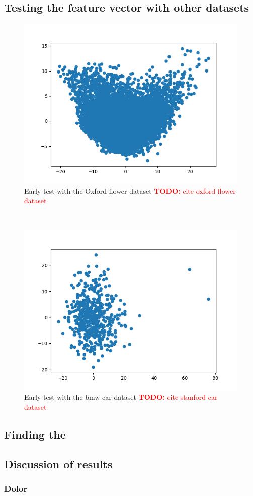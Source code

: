 \documentclass[journal]{vgtc}       %
\newcommand{\todo}[1]{\textcolor{red}{\textbf{TODO:} #1}}
\begin{document}
\subsection{Testing the feature vector with other datasets}
\begin{figure}
  \begin{center}
  \includegraphics[width=.6\linewidth]{Figure1.png}
  \end{center}
  \caption{\label{fig:lorem} Early test with the Oxford flower dataset \todo{cite oxford flower dataset}}
\end{figure} ~ \\
\begin{figure}
  \begin{center}
  \includegraphics[width=.6\linewidth]{Figure2.png}
  \end{center}
  \caption{\label{fig:bmw} Early test with the bmw car dataset \todo{cite stanford car dataset}}
\end{figure}
\subsection{Finding the }
\subsection{Discussion of results}
\subsubsection{Dolor}
\end{document}
